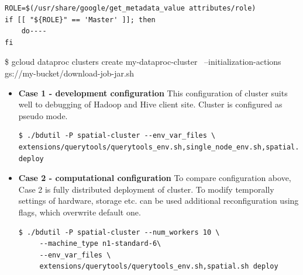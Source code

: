 \documentclass[a4paper,12pt,oneside]{report}
\begin{document}
 \begin{footnotesize}
\begin{lstlisting}[style=python]
ROLE=$(/usr/share/google/get_metadata_value attributes/role)
if [[ "${ROLE}" == 'Master' ]]; then 
	do----
fi
\end{lstlisting}
\end{footnotesize}
 
\$ gcloud dataproc clusters create my-dataproc-cluster \
    --initialization-actions gs://my-bucket/download-job-jar.sh
 
 
 
\begin{itemize}
\item \textbf{Case 1 - development configuration}  This configuration of cluster suits well to debugging 
of Hadoop and Hive client site. Cluster is configured as pseudo mode.
\begin{footnotesize}
\begin{lstlisting}[style=python]
$ ./bdutil -P spatial-cluster --env_var_files \
extensions/querytools/querytools_env.sh,single_node_env.sh,spatial.sh deploy
\end{lstlisting}
\end{footnotesize}


\item \textbf{Case 2 - computational configuration}  To compare configuration above, Case 2 is fully 
distributed deployment of cluster. To modify temporally settings of hardware, storage etc. can be used 
additional reconfiguration using flags, which overwrite default one.
%
\begin{footnotesize}
\begin{lstlisting}[style=python]
$ ./bdutil -P spatial-cluster --num_workers 10 \
     --machine_type n1-standard-6\
     --env_var_files \
     extensions/querytools/querytools_env.sh,spatial.sh deploy
\end{lstlisting}
\end{footnotesize}

\end{itemize}


\end{document}
